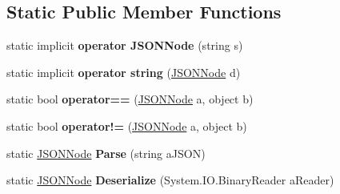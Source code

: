 \subsection*{Static Public Member Functions}
\begin{DoxyCompactItemize}
\item 
\mbox{\label{class_lunar_console_editor_internal_1_1_j_s_o_n_node_a063524f450cd643a0fb514f993a1c489}} 
static implicit {\bfseries operator J\+S\+O\+N\+Node} (string s)
\item 
\mbox{\label{class_lunar_console_editor_internal_1_1_j_s_o_n_node_af963298bc245b8c5b5bc2b0d2a39b53d}} 
static implicit {\bfseries operator string} (\mbox{\hyperlink{class_lunar_console_editor_internal_1_1_j_s_o_n_node}{J\+S\+O\+N\+Node}} d)
\item 
\mbox{\label{class_lunar_console_editor_internal_1_1_j_s_o_n_node_a1fd3b6fe39beb3986cc2d7817d4ca3bb}} 
static bool {\bfseries operator==} (\mbox{\hyperlink{class_lunar_console_editor_internal_1_1_j_s_o_n_node}{J\+S\+O\+N\+Node}} a, object b)
\item 
\mbox{\label{class_lunar_console_editor_internal_1_1_j_s_o_n_node_a03d56e75af2972c1c9940e3b7cdf46f2}} 
static bool {\bfseries operator!=} (\mbox{\hyperlink{class_lunar_console_editor_internal_1_1_j_s_o_n_node}{J\+S\+O\+N\+Node}} a, object b)
\item 
\mbox{\label{class_lunar_console_editor_internal_1_1_j_s_o_n_node_aaf5b3c756ff01d94fbb248187eea38f9}} 
static \mbox{\hyperlink{class_lunar_console_editor_internal_1_1_j_s_o_n_node}{J\+S\+O\+N\+Node}} {\bfseries Parse} (string a\+J\+S\+ON)
\item 
\mbox{\label{class_lunar_console_editor_internal_1_1_j_s_o_n_node_afdd68ea249660623ff017ef0787f5bb0}} 
static \mbox{\hyperlink{class_lunar_console_editor_internal_1_1_j_s_o_n_node}{J\+S\+O\+N\+Node}} {\bfseries Deserialize} (System.\+I\+O.\+Binary\+Reader a\+Reader)
\item 

\end{DoxyCompactItemize}
